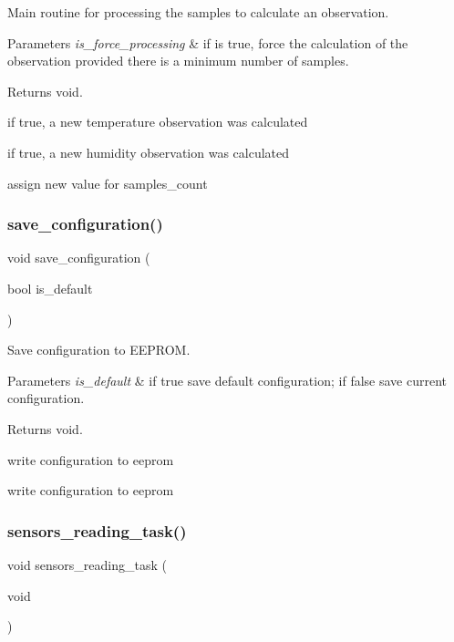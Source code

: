 Main routine for processing the samples to calculate an observation. 


\begin{DoxyParams}{Parameters}
{\em is\+\_\+force\+\_\+processing} & if is true, force the calculation of the observation provided there is a minimum number of samples. \\
\hline
\end{DoxyParams}
\begin{DoxyReturn}{Returns}
void. 
\end{DoxyReturn}
if true, a new temperature observation was calculated

if true, a new humidity observation was calculated

assign new value for samples\+\_\+count \mbox{\label{i2c-th_8h_a8801fa7c9f323c5b8b9b2bb5b1c438ff}} 
\subsubsection{\texorpdfstring{save\+\_\+configuration()}{save\_configuration()}}
{\footnotesize\ttfamily void save\+\_\+configuration (\begin{DoxyParamCaption}\item[{bool}]{is\+\_\+default }\end{DoxyParamCaption})}



Save configuration to E\+E\+P\+R\+OM. 


\begin{DoxyParams}{Parameters}
{\em is\+\_\+default} & if true save default configuration; if false save current configuration. \\
\hline
\end{DoxyParams}
\begin{DoxyReturn}{Returns}
void. 
\end{DoxyReturn}
write configuration to eeprom

write configuration to eeprom \mbox{\label{i2c-th_8h_af0e8965583b124096972fe3a9e0e7954}} 
\subsubsection{\texorpdfstring{sensors\+\_\+reading\+\_\+task()}{sensors\_reading\_task()}}
{\footnotesize\ttfamily void sensors\+\_\+reading\+\_\+task (\begin{DoxyParamCaption}\item[{void}]{ }\end{DoxyParamCaption})}



